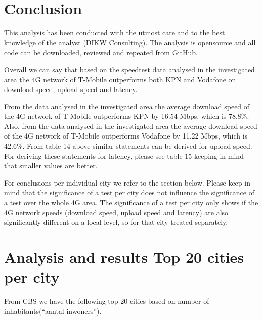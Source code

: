 \documentclass[]{article}
\begin{document}
\newpage

\section{Conclusion}\label{conclusion}

This analysis has been conducted with the utmost care and to the best
knowledge of the analyst (DIKW Consulting). The analysis is opensource
and all code can be downloaded, reviewed and repeated from
\href{https://github.com/hugokoopmans/ookla-speedtest-analysis}{GitHub}.

Overall we can say that based on the speedtest data analysed in the
investigated area the 4G network of T-Mobile outperforms both KPN and
Vodafone on download speed, upload speed and latency.

From the data analysed in the investigated area the average download
speed of the 4G network of T-Mobile outperforms KPN by 16.54 Mbps, which
is 78.8\%. Also, from the data analysed in the investigated area the
average download speed of the 4G network of T-Mobile outperforms
Vodafone by 11.22 Mbps, which is 42.6\%. From table 14 above similar
statements can be derived for upload speed. For deriving these
statements for latency, please see table 15 keeping in mind that smaller
values are better.

For conclusions per individual city we refer to the section below.
Please keep in mind that the significance of a test per city does not
influence the significance of a test over the whole 4G area. The
significance of a test per city only shows if the 4G network speeds
(download speed, upload speed and latency) are also significantly
different on a local level, so for that city treated separately.

\newpage

\section{Analysis and results Top 20 cities per
city}\label{analysis-and-results-top-20-cities-per-city}

From CBS we have the following top 20 cities based on number of
inhabitants(``aantal inwoners'').
\end{document}
